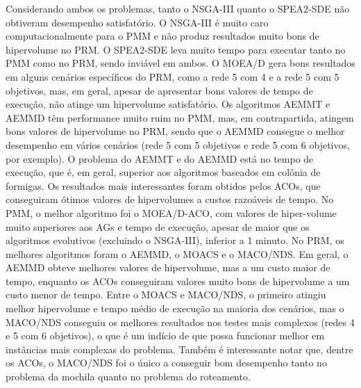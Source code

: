 Considerando ambos os problemas, tanto o NSGA-III quanto o SPEA2-SDE não obtiveram desempenho satisfatório. O NSGA-III é muito caro computacionalmente para o PMM e não produz resultados muito bons de hipervolume no PRM. O SPEA2-SDE leva muito tempo para executar tanto no PMM como no PRM, sendo inviável em ambos. O MOEA/D gera bons resultados em alguns cenários específicos do PRM, como a rede 5 com 4 e a rede 5 com 5 objetivos, mas, em geral, apesar de apresentar bons valores de tempo de execução, não atinge um hipervolume satisfatório. Os algoritmos AEMMT e AEMMD têm performance muito ruim no PMM, mas, em contrapartida, atingem bons valores de hipervolume no PRM, sendo que o AEMMD consegue o melhor desempenho em vários cenários (rede 5 com 5 objetivos e rede 5 com 6 objetivos, por exemplo). O problema do AEMMT e do AEMMD está no tempo de execução, que é, em geral, superior aos algoritmos baseados em colônia de formigas. Os resultados mais interessantes foram obtidos pelos ACOs, que conseguiram ótimos valores de hipervolumes a custos razoáveis de tempo. No PMM, o melhor algoritmo foi o MOEA/D-ACO, com valores de hiper-volume muito superiores aos AGs e tempo de execução, apesar de maior que os algoritmos evolutivos (excluindo o NSGA-III), inferior a 1 minuto. No PRM, os melhores algoritmos foram o AEMMD, o MOACS e o MACO/NDS. Em geral, o AEMMD obteve melhores valores de hipervolume, mas a um custo maior de tempo, enquanto os ACOs conseguiram valores muito bons de hipervolume a um custo menor de tempo. Entre o MOACS e MACO/NDS, o primeiro atingiu melhor hipervolume e tempo médio de execução na maioria dos cenários, mas o MACO/NDS conseguiu os melhores resultados nos testes mais complexos (redes 4 e 5 com 6 objetivos), o que é um indício de que possa funcionar melhor em instâncias mais complexas do problema. Também é interessante notar que, dentre os ACOs, o MACO/NDS foi o único a conseguir bom desempenho tanto no problema da mochila quanto no problema do roteamento.
